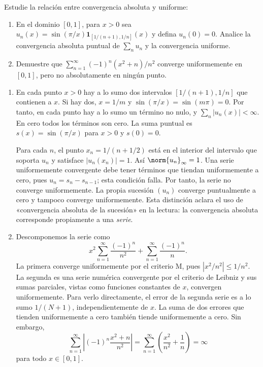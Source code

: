 \begin{ejercicio}
Estudie la relación entre convergencia absoluta y uniforme:
\begin{enumerate}[label=(\roman*)]
\item En el dominio $[0,1]$, para $x>0$ sea $u_n(x)=\sin(\pi/x)\mathbf1_{[1/(n+1),1/n]}(x)$ y defina $u_n(0)=0$. Analice la convergencia absoluta puntual de $\sum_nu_n$ y la convergencia uniforme.
\item Demuestre que $\sum_{n=1}^\infty(-1)^n(x^2+n)/n^2$ converge uniformemente en $[0,1]$, pero no absolutamente en ningún punto.
\end{enumerate}
\end{ejercicio}
\begin{solucion}
\begin{enumerate}[label=(\roman*)]
\item En cada punto $x>0$ hay a lo sumo dos intervalos $[1/(n+1),1/n]$ que contienen a $x$. Si hay dos, $x=1/m$ y $\sin(\pi/x)=\sin(m\pi)=0$. Por tanto, en cada punto hay a lo sumo un término no nulo, y $\sum_n|u_n(x)|<\infty$. En cero todos los términos son cero. La suma puntual es $s(x)=\sin(\pi/x)$ para $x>0$ y $s(0)=0$.

Para cada $n$, el punto $x_n=1/(n+1/2)$ está en el interior del intervalo que soporta $u_n$ y satisface $|u_n(x_n)|=1$. Así $\norm{u_n}_\infty=1$. Una serie uniformemente convergente debe tener términos que tiendan uniformemente a cero, pues $u_n=s_n-s_{n-1}$; esta condición falla. Por tanto, la serie no converge uniformemente. La propia sucesión $(u_n)$ converge puntualmente a cero y tampoco converge uniformemente. Esta distinción aclara el uso de «convergencia absoluta de la sucesión» en la lectura: la convergencia absoluta corresponde propiamente a una \emph{serie}.
\item Descomponemos la serie como
\[
 x^2\sum_{n=1}^\infty\frac{(-1)^n}{n^2}
 +\sum_{n=1}^\infty\frac{(-1)^n}{n}.
\]
La primera converge uniformemente por el criterio M, pues $|x^2/n^2|\le1/n^2$. La segunda es una serie numérica convergente por el criterio de Leibniz y sus sumas parciales, vistas como funciones constantes de $x$, convergen uniformemente. Para verlo directamente, el error de la segunda serie es a lo sumo $1/(N+1)$, independientemente de $x$. La suma de dos errores que tienden uniformemente a cero también tiende uniformemente a cero. Sin embargo,
\[
 \sum_{n=1}^\infty\left|(-1)^n\frac{x^2+n}{n^2}\right|
 =\sum_{n=1}^\infty\left(\frac{x^2}{n^2}+\frac1n\right)=\infty
\]
para todo $x\in[0,1]$.
\end{enumerate}
\end{solucion}

